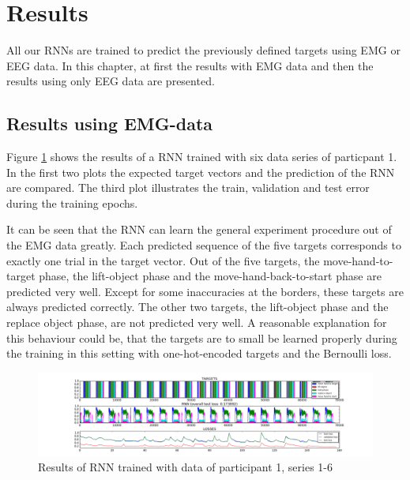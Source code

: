 \documentclass{article} %
\begin{document}
\section{Results}
All our RNNs are trained to predict the previously defined targets using EMG or EEG data. In this chapter, at first the results with EMG data and then the results using only EEG data are presented.
\subsection{Results using EMG-data}
Figure \ref{fig:emg_RNN_1} shows the results of a RNN trained with six data series of particpant 1. In the first two plots the expected target vectors and the prediction of the RNN are compared. The third plot illustrates the train, validation and test error during the training epochs.

It can be seen that the RNN can learn the general experiment procedure out of the EMG data greatly. Each predicted sequence of the five targets corresponds to exactly one trial in the target vector. Out of the five targets, the move-hand-to-target phase, the lift-object phase and the move-hand-back-to-start phase are predicted very well. Except for some inaccuracies at the borders, these targets are always predicted correctly. The other two targets, the lift-object phase and the replace object phase, are not predicted very well. A reasonable explanation for this behaviour could be, that the targets are to small be learned properly during the training in this setting with one-hot-encoded targets and the Bernoulli loss.
\begin{figure}
	\centering
	\includegraphics[width=1.0\textwidth]{images/EMG-results_participant_1_series1-6.png}
	\caption{Results of RNN trained with data of participant 1, series 1-6}
	\label{fig:emg_RNN_1}
\end{figure}
\end{document}
